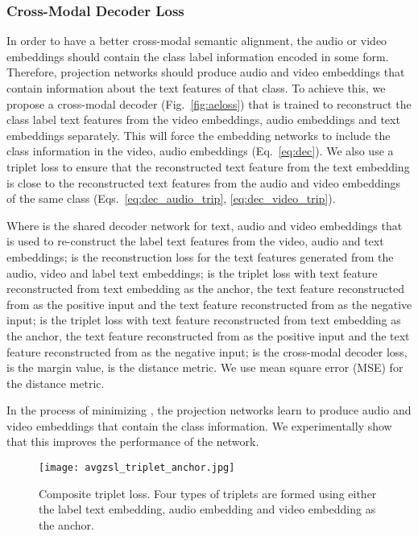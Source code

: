 \documentclass[10pt,twocolumn,letterpaper]{article}
\begin{document}
\subsubsection{Cross-Modal Decoder Loss} \label{sec:cmd}
In order to have a better cross-modal semantic alignment, the audio or video embeddings should contain the class label information encoded in some form. Therefore, projection networks should produce audio and video embeddings that contain information about the text features of that class. To achieve this, we propose a cross-modal decoder (Fig.~\ref{fig:aeloss}) that is trained to reconstruct the class label text features from the video embeddings, audio embeddings and text embeddings separately. This will force the embedding networks to include the class information in the video, audio embeddings (Eq.~\ref{eq:dec}). We also use a triplet loss to ensure that the reconstructed text feature from the text embedding is close to the reconstructed text features from the audio and video embeddings of the same class (Eqs.~\ref{eq:dec_audio_trip}, \ref{eq:dec_video_trip}).




Where  is the shared decoder network for text, audio and video embeddings that is used to re-construct the label text features from the video, audio and text embeddings;  is the reconstruction loss for the text features generated from the audio, video and label text embeddings;  is the triplet loss with text feature reconstructed from text embedding as the anchor, the text feature reconstructed from  as the positive input and the text feature reconstructed from  as the negative input;  is the triplet loss with text feature reconstructed from text embedding as the anchor, the text feature reconstructed from  as the positive input and the text feature reconstructed from  as the negative input;  is the cross-modal decoder loss,  is the margin value,  is the distance metric. We use mean square error (MSE) for the distance metric.

In the process of minimizing , the projection networks learn to produce audio and video embeddings that contain the class information. We experimentally show that this improves the performance of the network.


\begin{figure}[t]
  \centering
  \texttt{[image: avgzsl\_triplet\_anchor.jpg]}
\caption{Composite triplet loss. Four types of triplets are formed using either the label text embedding, audio embedding and video embedding as the anchor.}
\label{fig:triploss}
 \vspace{-10pt}
\end{figure}
\end{document}
